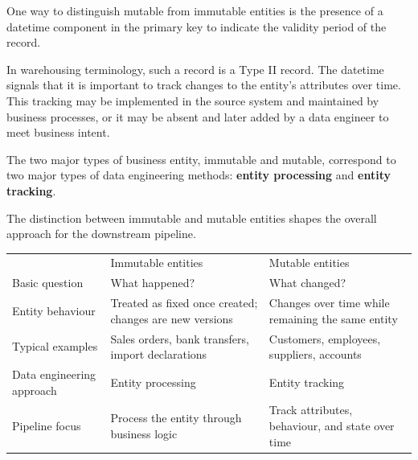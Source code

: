 \documentclass[10pt,openany,10pt]{book}
\newcounter{none}
\let\podeToprule\toprule
\let\podeMidrule\midrule
\let\podeBottomrule\bottomrule
\renewcommand{\toprule}{\arrayrulecolor{pbiGrid}\podeToprule}
\renewcommand{\midrule}{\arrayrulecolor{pbiGrid}\podeMidrule}
\renewcommand{\bottomrule}{\arrayrulecolor{pbiGrid}\podeBottomrule}
\begin{document}
One way to distinguish mutable from immutable entities is the presence
of a datetime component in the primary key to indicate the validity
period of the record.

In warehousing terminology, such a record is a Type II record. The
datetime signals that it is important to track changes to the entity's
attributes over time. This tracking may be implemented in the source
system and maintained by business processes, or it may be absent and
later added by a data engineer to meet business intent.

The two major types of business entity, immutable and mutable,
correspond to two major types of data engineering methods:
\textbf{entity processing} and \textbf{entity tracking}.

The distinction between immutable and mutable entities shapes the
overall approach for the downstream pipeline.

{\def\LTcaptype{none} %
\begin{longtable}[]{@{}
  >{\raggedright\arraybackslash}p{}
  >{\raggedright\arraybackslash}p{}
  >{\raggedright\arraybackslash}p{}@{}}
\toprule\noalign{}
\begin{minipage}[b]{\linewidth}\raggedright
\end{minipage} & \begin{minipage}[b]{\linewidth}\raggedright
Immutable entities
\end{minipage} & \begin{minipage}[b]{\linewidth}\raggedright
Mutable entities
\end{minipage} \\
\midrule\noalign{}
\endhead
\bottomrule\noalign{}
\endlastfoot
Basic question & What happened? & What changed? \\
Entity behaviour & Treated as fixed once created; changes are new
versions & Changes over time while remaining the same entity \\
Typical examples & Sales orders, bank transfers, import declarations &
Customers, employees, suppliers, accounts \\
Data engineering approach & Entity processing & Entity tracking \\
Pipeline focus & Process the entity through business logic & Track
attributes, behaviour, and state over time \\
\end{longtable}
}
\end{document}
